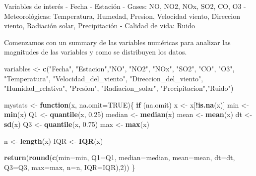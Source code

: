 \documentclass[notspecified,article,submit,moreauthors,pdftex]{Definitions/mdpi}
\newenvironment{Shaded}{\begin{snugshade}}{\end{snugshade}}
\newcommand{\AttributeTok}[1]{\textcolor[rgb]{0.13,0.29,0.53}{#1}}
\newcommand{\ConstantTok}[1]{\textcolor[rgb]{0.56,0.35,0.01}{#1}}
\newcommand{\ControlFlowTok}[1]{\textcolor[rgb]{0.13,0.29,0.53}{\textbf{#1}}}
\newcommand{\DecValTok}[1]{\textcolor[rgb]{0.00,0.00,0.81}{#1}}
\newcommand{\FloatTok}[1]{\textcolor[rgb]{0.00,0.00,0.81}{#1}}
\newcommand{\FunctionTok}[1]{\textcolor[rgb]{0.13,0.29,0.53}{\textbf{#1}}}
\newcommand{\NormalTok}[1]{#1}
\newcommand{\OtherTok}[1]{\textcolor[rgb]{0.56,0.35,0.01}{#1}}
\newcommand{\SpecialCharTok}[1]{\textcolor[rgb]{0.81,0.36,0.00}{\textbf{#1}}}
\newcommand{\StringTok}[1]{\textcolor[rgb]{0.31,0.60,0.02}{#1}}
\begin{document}
Variables de interés - Fecha - Estación - Gases: NO, NO2, NOx, SO2, CO,
O3 - Meteorológicas: Temperatura, Humedad, Presion, Velocidad viento,
Direccion viento, Radiación solar, Precipitación - Calidad de vida:
Ruido

Comenzamos con un summary de las variables numéricas para analizar las
magnitudes de las variables y como se distribuyen los datos.

\begin{Shaded}
\begin{Highlighting}[]
\NormalTok{variables }\OtherTok{\textless{}{-}} \FunctionTok{c}\NormalTok{(}\StringTok{"Fecha"}\NormalTok{, }\StringTok{"Estacion"}\NormalTok{,}\StringTok{"NO"}\NormalTok{, }\StringTok{"NO2"}\NormalTok{, }\StringTok{"NOx"}\NormalTok{, }\StringTok{"SO2"}\NormalTok{, }\StringTok{"CO"}\NormalTok{, }\StringTok{"O3"}\NormalTok{, }\StringTok{"Temperatura"}\NormalTok{, }\StringTok{"Velocidad\_del\_viento"}\NormalTok{, }\StringTok{"Direccion\_del\_viento"}\NormalTok{, }\StringTok{"Humidad\_relativa"}\NormalTok{, }\StringTok{"Presion"}\NormalTok{, }\StringTok{"Radiacion\_solar"}\NormalTok{, }\StringTok{"Precipitacion"}\NormalTok{,}\StringTok{"Ruido"}\NormalTok{)}

\NormalTok{mystats }\OtherTok{\textless{}{-}} \ControlFlowTok{function}\NormalTok{(x, }\AttributeTok{na.omit=}\ConstantTok{TRUE}\NormalTok{)\{}
                \ControlFlowTok{if}\NormalTok{ (na.omit)}
\NormalTok{                    x }\OtherTok{\textless{}{-}}\NormalTok{ x[}\SpecialCharTok{!}\FunctionTok{is.na}\NormalTok{(x)]}
\NormalTok{                min }\OtherTok{\textless{}{-}} \FunctionTok{min}\NormalTok{(x)}
\NormalTok{                Q1 }\OtherTok{\textless{}{-}} \FunctionTok{quantile}\NormalTok{(x, }\FloatTok{0.25}\NormalTok{)}
\NormalTok{                median }\OtherTok{\textless{}{-}} \FunctionTok{median}\NormalTok{(x)}
\NormalTok{                mean }\OtherTok{\textless{}{-}} \FunctionTok{mean}\NormalTok{(x)}
\NormalTok{                dt }\OtherTok{\textless{}{-}} \FunctionTok{sd}\NormalTok{(x)}
\NormalTok{                Q3 }\OtherTok{\textless{}{-}} \FunctionTok{quantile}\NormalTok{(x, }\FloatTok{0.75}\NormalTok{)}
\NormalTok{                max }\OtherTok{\textless{}{-}} \FunctionTok{max}\NormalTok{(x)}
                
\NormalTok{                n }\OtherTok{\textless{}{-}} \FunctionTok{length}\NormalTok{(x)}
\NormalTok{                IQR }\OtherTok{\textless{}{-}} \FunctionTok{IQR}\NormalTok{(x)}
                
                \FunctionTok{return}\NormalTok{(}\FunctionTok{round}\NormalTok{(}\FunctionTok{c}\NormalTok{(}\AttributeTok{min=}\NormalTok{min, }\AttributeTok{Q1=}\NormalTok{Q1, }\AttributeTok{median=}\NormalTok{median, }\AttributeTok{mean=}\NormalTok{mean, }\AttributeTok{dt=}\NormalTok{dt, }\AttributeTok{Q3=}\NormalTok{Q3, }\AttributeTok{max=}\NormalTok{max, }\AttributeTok{n=}\NormalTok{n, }\AttributeTok{IQR=}\NormalTok{IQR),}\DecValTok{2}\NormalTok{))}
\NormalTok{\} }


\end{Highlighting}
\end{Shaded}
\end{document}
